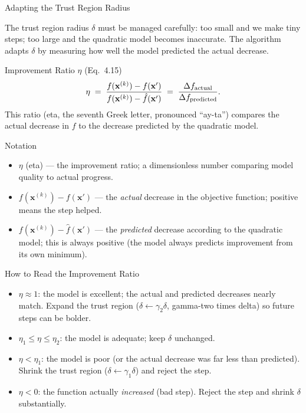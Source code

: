 \documentclass[aspectratio=169,10pt]{beamer}
\newcommand{\bx}{\mathbf{x}}
\begin{document}
\begin{frame}[allowframebreaks]{Adapting the Trust Region Radius}

  The trust region radius $\delta$ must be managed carefully: too small
  and we make tiny steps; too large and the quadratic model becomes
  inaccurate.  The algorithm adapts $\delta$ by measuring how well the
  model predicted the actual decrease.

  \begin{block}{Improvement Ratio $\eta$ (Eq.\ 4.15)}
    \[
      \eta \;=\;
      \frac{f(\bx^{(k)}) - f(\bx')}
           {f(\bx^{(k)}) - \hat{f}(\bx')}
      \;=\;
      \frac{\Delta f_{\rm actual}}{\Delta f_{\rm predicted}}.
    \]
    This ratio (eta, the seventh Greek letter, pronounced ``ay-ta'')
    compares the actual decrease in $f$ to the decrease predicted by
    the quadratic model.
  \end{block}

  \begin{block}{Notation}
    \begin{itemize}
      \item $\eta$ (eta) --- the improvement ratio; a dimensionless
            number comparing model quality to actual progress.
      \item $f(\bx^{(k)}) - f(\bx')$ --- the \emph{actual} decrease in
            the objective function; positive means the step helped.
      \item $f(\bx^{(k)}) - \hat{f}(\bx')$ --- the \emph{predicted}
            decrease according to the quadratic model; this is always
            positive (the model always predicts improvement from its
            own minimum).
    \end{itemize}
  \end{block}

  \framebreak

  \begin{alertblock}{How to Read the Improvement Ratio}
    \begin{itemize}
      \item $\eta \approx 1$: the model is excellent; the actual and
            predicted decreases nearly match.  Expand the trust region
            ($\delta \leftarrow \gamma_2 \delta$, gamma-two times
            delta) so future steps can be bolder.
      \item $\eta_1 \le \eta \le \eta_2$: the model is adequate; keep
            $\delta$ unchanged.
      \item $\eta < \eta_1$: the model is poor (or the actual decrease
            was far less than predicted).  Shrink the trust region
            ($\delta \leftarrow \gamma_1 \delta$) and reject the step.
      \item $\eta < 0$: the function actually \emph{increased} (bad
            step).  Reject the step and shrink $\delta$ substantially.
    \end{itemize}
  \end{alertblock}


\end{frame}
\end{document}
